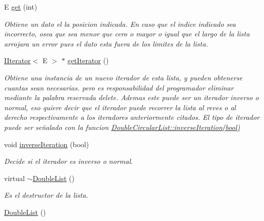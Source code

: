 \begin{DoxyCompactItemize}
E \hyperlink{class_double_list_a230a8c9c574abe9c72f8daae35127d9c}{get} (int)
\begin{DoxyCompactList}\small\item\em Obtiene un dato el la posicion indicada. En caso que el indice indicado sea incorrecto, osea que sea menor que cero o mayor o igual que el largo de la lista arrojara un error pues el dato esta fuera de los limites de la lista. \end{DoxyCompactList}\item 
\hyperlink{class_i_iterator}{I\-Iterator}$<$ E $>$ $\ast$ \hyperlink{class_double_list_aa14e383a97e054016a6c5178165b20df}{get\-Iterator} ()
\begin{DoxyCompactList}\small\item\em Obtiene una instancia de un nuevo iterador de esta lista, y pueden obtenerse cuantas sean necesarias. pero es responsabilidad del programador eliminar mediante la palabra reservada delete. Ademas este puede ser un iterador inverso o normal, eso quiere decir que el iterador puede recorrer la lista al reves o al derecho respectivamente a los iteradores anteriormente citados. El tipo de iterador puede ser señalado con la funcion \hyperlink{class_double_circular_list_a77212c5d6ad148c99a06009a8c44128b}{Double\-Circular\-List\-::inverse\-Iteration(bool)}\end{DoxyCompactList}\item 
void \hyperlink{class_double_list_a94d1ad5299452ea46839ba350ca501d1}{inverse\-Iteration} (bool)
\begin{DoxyCompactList}\small\item\em Decide si el iterador es inverso o normal. \end{DoxyCompactList}\item 
virtual \hyperlink{class_double_list_a11ce233388fea7a5722a7d57cea400a3}{$\sim$\-Double\-List} ()
\begin{DoxyCompactList}\small\item\em Es el destructor de la lista. \end{DoxyCompactList}\item 
\hyperlink{class_double_list_ab54db9c718c7188f9413ef2b9982dd43}{Double\-List} ()
\end{DoxyCompactItemize}
